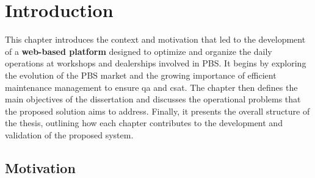 \chapter{Introduction}%
\label{chapter:introduction}

\begin{introduction}


This chapter introduces the context and motivation that led to the development of a \textbf{web-based platform} designed to optimize and organize the daily operations at workshops and dealerships involved in \acs{PBS}. It begins by exploring the evolution of the \acs{PBS} market and the growing importance of efficient maintenance management to ensure \acs{qa} and \acs{csat}. The chapter then defines the main objectives of the dissertation and discusses the operational problems that the proposed solution aims to address. Finally, it presents the overall structure of the thesis, outlining how each chapter contributes to the development and validation of the proposed system.

\end{introduction} 


\section{Motivation}

